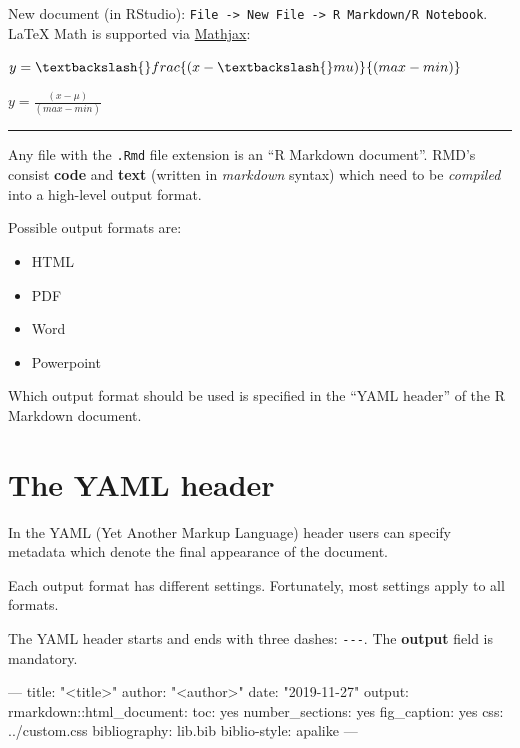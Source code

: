 \documentclass[]{book}
\newenvironment{Shaded}{}{}
\newcommand{\AttributeTok}[1]{#1}
\newcommand{\FunctionTok}[1]{#1}
\newcommand{\NormalTok}[1]{#1}
\newcommand{\OperatorTok}[1]{#1}
\newcommand{\OtherTok}[1]{\textcolor[rgb]{1.00,0.25,0.00}{#1}}
\newcommand{\StringTok}[1]{\textcolor[rgb]{0.00,0.50,0.50}{#1}}
\begin{document}
New document (in RStudio): \texttt{File\ -\textgreater{}\ New\ File\ -\textgreater{}\ R\ Markdown/R\ Notebook}.
LaTeX Math is supported via \href{https://www.mathjax.org/}{Mathjax}:

\begin{Shaded}
\begin{Highlighting}[]
\OperatorTok{$}\NormalTok{y=\textbackslash{}frac\{(x }\OperatorTok{-}\StringTok{ }\NormalTok{\textbackslash{}mu)\}\{(max }\OperatorTok{-}\StringTok{ }\NormalTok{min)\}}\OperatorTok{$}
\end{Highlighting}
\end{Shaded}

\(y=\frac{(x - \mu)}{(max - min)}\)

\begin{center}\rule{0.5\linewidth}{\linethickness}\end{center}

Any file with the \texttt{.Rmd} file extension is an ``R Markdown document''.
RMD's consist \textbf{code} and \textbf{text} (written in \emph{markdown} syntax) which need to be \emph{compiled} into a high-level output format.

Possible output formats are:

\begin{itemize}
\item
  HTML
\item
  PDF
\item
  Word
\item
  Powerpoint
\end{itemize}

Which output format should be used is specified in the ``YAML header'' of the R Markdown document.

\hypertarget{the-yaml-header}{%
\section{The YAML header}\label{the-yaml-header}}

In the YAML (Yet Another Markup Language) header users can specify metadata which denote the final appearance of the document.

Each output format has different settings.
Fortunately, most settings apply to all formats.

The YAML header starts and ends with three dashes: \texttt{-\/-\/-}.
The \textbf{output} field is mandatory.

\begin{Shaded}
\begin{Highlighting}[]
\OtherTok{---}
\FunctionTok{title:}\AttributeTok{ }\StringTok{"<title>"}
\FunctionTok{author:}\AttributeTok{ }\StringTok{"<author>"}
\FunctionTok{date:}\AttributeTok{ }\StringTok{"2019-11-27"}
\FunctionTok{output:}
  \FunctionTok{rmarkdown:}\AttributeTok{:html_document:}
    \FunctionTok{toc:}\AttributeTok{ yes}
    \FunctionTok{number_sections:}\AttributeTok{ yes}
    \FunctionTok{fig_caption:}\AttributeTok{ yes}
    \FunctionTok{css:}\AttributeTok{ ../custom.css}
\FunctionTok{bibliography:}\AttributeTok{ lib.bib}
\FunctionTok{biblio-style:}\AttributeTok{ apalike}
\OtherTok{---}
\end{Highlighting}
\end{Shaded}
\end{document}
